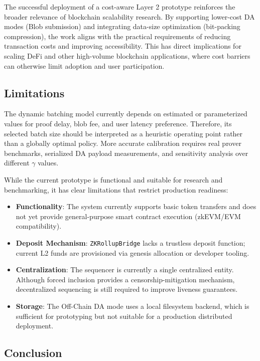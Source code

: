 The successful deployment of a cost-aware Layer 2 prototype reinforces the broader relevance of blockchain scalability research. By supporting lower-cost DA modes (Blob submission) and integrating data-size optimization (bit-packing compression), the work aligns with the practical requirements of reducing transaction costs and improving accessibility. This has direct implications for scaling DeFi and other high-volume blockchain applications, where cost barriers can otherwise limit adoption and user participation.

\subsection{Limitations}
The dynamic batching model currently depends on estimated or parameterized values for proof delay, blob fee, and user latency preference. Therefore, its selected batch size should be interpreted as a heuristic operating point rather than a globally optimal policy. More accurate calibration requires real prover benchmarks, serialized DA payload measurements, and sensitivity analysis over different \(\gamma\) values.

\vspace{12pt}

While the current prototype is functional and suitable for research and benchmarking, it has clear limitations that restrict production readiness:

\begin{itemize}
    \item \textbf{Functionality}: The system currently supports basic token transfers and does not yet provide general-purpose smart contract execution (zkEVM/EVM compatibility).
    \item \textbf{Deposit Mechanism}: \texttt{ZKRollupBridge} lacks a trustless deposit function; current L2 funds are provisioned via genesis allocation or developer tooling.
    \item \textbf{Centralization}: The sequencer is currently a single centralized entity. Although forced inclusion provides a censorship-mitigation mechanism, decentralized sequencing is still required to improve liveness guarantees.
    \item \textbf{Storage}: The Off-Chain DA mode uses a local filesystem backend, which is sufficient for prototyping but not suitable for a production distributed deployment.
\end{itemize}

\subsection{Conclusion}
\vspace{12pt}


